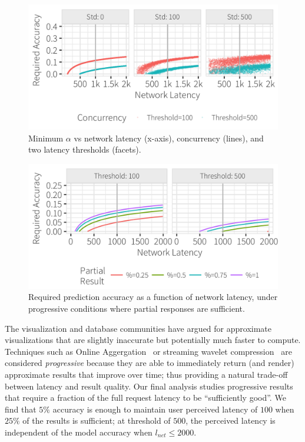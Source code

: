 \begin{figure}[h]
	\centering
	\includegraphics[width=1\columnwidth]{figures/model_std}
 	\caption{Minimum $\alpha$ vs network latency (x-axis), concurrency (lines), and two latency thresholds (facets).}
  \label{fig:model_std}
\end{figure}

\begin{figure}[hb]
	\centering
	\includegraphics[width=1\columnwidth]{figures/model_partial}
 	\caption{Required prediction accuracy as a function of network latency, under progressive conditions where partial responses are sufficient.}
    \label{fig:model_partial}
\end{figure}


The visualization and database communities have argued for approximate visualizations that are slightly inaccurate but potentially much faster to compute.  Techniques such as Online Aggergation~\cite{control,wanderjoin} or streaming wavelet compression~\cite{} are considered {\it progressive} because they are able to immediately return (and render) approximate results that improve over time; thus providing a natural trade-off between latency and result quality.  Our final analysis studies progressive results that require a fraction of the full request latency to be ``sufficiently good''.
 We find that $5\%$ accuracy is enough to maintain user perceived latency of $100$ when $25\%$ of the results is sufficient; at threshold of $500$, the perceived latency is independent of the model accuracy when $l_{net}\le 2000$.






